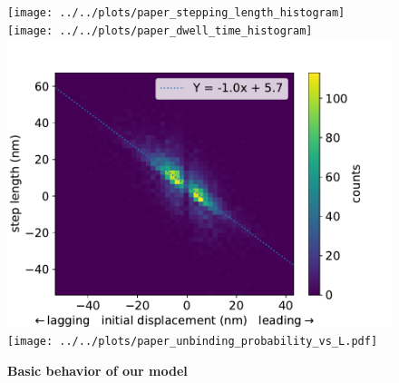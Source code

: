 \documentclass[9pt,twocolumn,twoside]{pnas-new}
\begin{document}

\begin{figure}[tbhp]
  \centering
  \texttt{[image: ../../plots/paper\_stepping\_length\_histogram]}
  \texttt{[image: ../../plots/paper\_dwell\_time\_histogram]}
  \includegraphics[width=0.5\linewidth]{../../plots/paper_displacement_vs_step_length.pdf}
  \texttt{[image: ../../plots/paper\_unbinding\_probability\_vs\_L.pdf]}
\caption{\textbf{Basic behavior of our model}}
\label{fig:}
\end{figure}
\end{document}
